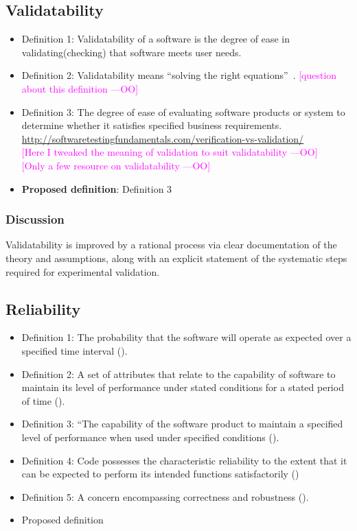 \documentclass[letterpaper,cleveref]{lipics-v2019}
\newcommand{\authornote}[3]{\textcolor{#1}{[#3 ---#2]}}
\newcommand{\authornote}[3]{}
\newcommand{\oo}[1]{\authornote{magenta}{OO}{#1}} %
\theoremstyle{definition}
\begin{document}
\subsection{Validatability}
\begin{itemize}
\item{Definition 1:} Validatability of a software is the degree of ease in validating(checking) that software meets user needs.\\
\item{Definition 2:} Validatability means ``solving the right equations''~\cite[p.~23]{Roache1998}.
\oo{question about this definition}\\
\item{Definition 3:} The degree of ease of evaluating software products or system to determine whether it satisfies specified business requirements. \url{http://softwaretestingfundamentals.com/verification-vs-validation/}\\
\oo{Here I tweaked the meaning of validation to suit validatability}\\
\oo{Only a few resource on validatability}\\
\item{\textbf{Proposed definition}:} Definition 3
\end{itemize}
\subsubsection{Discussion}
Validatability is improved by a rational process via clear documentation of the
theory and assumptions, along with an explicit statement of the systematic steps
required for experimental validation.

\subsection{Reliability}
\begin{itemize}
	\item{Definition 1:} The probability that the software will operate as expected over a specified time interval (\cite{GhezziEtAl2003}).\\
	\item{Definition 2:} A set of attributes that relate to the capability of software to maintain its level of performance under stated conditions for a stated period of time (\cite{berander2005software}).\\
	\item{Definition 3:} “The capability of the software product to maintain a specified level of performance when used under specified conditions (\cite{international2001iso}).\\
	\item{Definition 4:} Code possesses the characteristic reliability to the extent that it can be expected to perform its intended functions satisfactorily (\cite{boehm2007software})\\
	\item{Definition 5:} A concern encompassing correctness and robustness (\cite{meyer1988object}).\\
	\item{Proposed definition}\\
\end{itemize}
\end{document}
